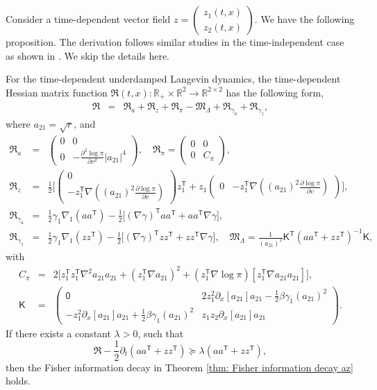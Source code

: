 \documentclass[11pt,reqno]{amsart}
\newcommand{\ts}{\mathsf{T}}
\newcommand{\beaa}{\begin{eqnarray*}}
\newcommand{\eeaa}{\end{eqnarray*}}
\def\pa{\partial}
\begin{document}
Consider a time-dependent vector field  $z=\begin{pmatrix} z_1(t,x) \\ z_2(t,x)\end{pmatrix}$. We have the following proposition. The derivation follows similar studies in the time-independent case as shown in \cite{FengLi2021}. We skip the details here.
\begin{proposition}\label{thm: constant z}
For the time-dependent underdamped Langevin dynamics, the time-dependent Hessian matrix function $\mathfrak{R}(t,x): \mathbb R_+\times \mathbb R^2\rightarrow \mathbb{R}^{2\times 2}$ has the following form, 
\beaa 
\mathfrak{R}&=&  \mathfrak R_a+\mathfrak R_z+\mathfrak R_{\pi}-\mathfrak M_{\Lambda}+\mathfrak R_{\gamma_a}+
\mathfrak R_{\gamma_z},
\eeaa
where $a_{21}=\sqrt{r}$, and 
\beaa 
\mathfrak R_a&=&\begin{pmatrix}
0&0\\
0& -\frac{\partial^2  \log\pi }{\partial v^2} |a_{21}|^4
\end{pmatrix},\quad \mathfrak{R}_{\pi}
	=\begin{pmatrix}
0&0\\
0& C_{\pi}
\end{pmatrix}, \\
\mathfrak R_z&=&\frac{1}{2}\Big[  \begin{pmatrix}
0\\
-z^{\ts}_1\nabla((a_{21})^2 \frac{\partial  \log\pi }{\partial v})
\end{pmatrix} z^{\ts}_1+z_1\begin{pmatrix}
0& -z^{\ts}_1\nabla((a_{21})^2 \frac{\partial  \log\pi }{\partial v})
\end{pmatrix} \Big],\\ 
\mathfrak R_{\gamma_a}&=&{\frac{1}{2}}\gamma_1\nabla_1(aa^{\ts})-\frac{1}{2}\Big[ (\nabla \gamma)^{\ts}aa^{\ts}+aa^{\ts}\nabla\gamma \Big],\\ 
\mathfrak R_{\gamma_z}&=&{\frac{1}{2}}\gamma_1\nabla_1(zz^{\ts})-\frac{1}{2}\Big[(\nabla \gamma)^{\ts}zz^{\ts}+zz^{\ts}\nabla\gamma \Big],
\quad \mathfrak M_{\Lambda}=\frac{1}{(a_{21})^2} \mathsf K^{\ts}(aa^{\ts}+zz^{\ts})^{-1}\mathsf K,
\eeaa
with
\beaa\label{C pi}
C_\pi&=&2\Big[z^{\ts}_{1} z^{\ts}_{1} \nabla^2 a_{21}  a_{21}+(z^{\ts}_{1}\nabla a_{21} )^2+ (z^{\ts}_1\nabla\log\pi) [ z^{\ts}_{ 1}\nabla a_{21} a_{21}]\Big],\\
\mathsf K&=&\begin{pmatrix} \mathsf 0& 2z_1^2\pa_x[a_{21}]a_{21}-\frac{1}{2}\beta\gamma_1(a_{21})^2\\
-z_1^2\pa_x[a_{21}]a_{21}+\frac{1}{2}\beta \gamma_1(a_{21})^2&z_1z_2\pa_x[a_{21}]a_{21}\end{pmatrix}.
\eeaa 
If there exists a constant $\lambda>0$, such that 
\begin{equation*}
\mathfrak{R}-\frac{1}{2}\pa_t(aa^{\ts}+zz^{\ts})\succeq \lambda (aa^{\ts}+zz^{\ts}), 
\end{equation*}
then the Fisher information decay in Theorem \ref{thm: Fisher information decay az} holds.
\end{proposition}
\end{document}
